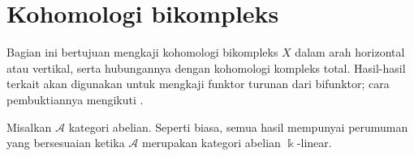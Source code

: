 
\section{Kohomologi bikompleks}\label{sec:double-cplx-coh}
\hypertarget{o014.aljabr2.chapter3.double-complex-cohomology}{ }

Bagian ini bertujuan mengkaji kohomologi bikompleks $X$ dalam arah horizontal
atau vertikal, serta hubungannya dengan kohomologi kompleks total. Hasil-hasil
terkait akan digunakan untuk mengkaji funktor turunan dari bifunktor; cara
pembuktiannya mengikuti \cite[\S 12.5]{KS06}.

Misalkan $\mathcal{A}$ kategori abelian. Seperti biasa, semua hasil mempunyai
perumuman yang bersesuaian ketika $\mathcal{A}$ merupakan kategori abelian
$\Bbbk$-linear.

